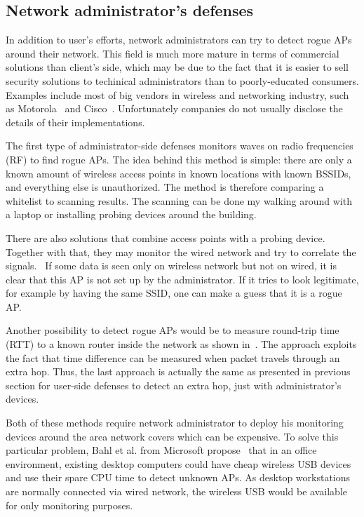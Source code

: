 \documentclass[12pt,a4paper,oneside,pdftex]{report}
\begin{document}
\subsection{Network administrator's defenses}

In addition to user's efforts, network administrators can try to detect rogue APs around their network. This field is much more mature in terms of commercial solutions than client's side, which may be due to the fact that it is easier to sell security solutions to techinical administrators than to poorly-educated consumers. Examples include most of big vendors in wireless and networking industry, such as Motorola~\cite{motorola_airdefense} and Cisco~\cite{cisco_ips}. Unfortunately companies do not usually disclose the details of their implementations.

The first type of administrator-side defenses monitors waves on radio frequencies (RF) to find rogue APs. The idea behind this method is simple: there are only a known amount of wireless access points in known locations with known BSSIDs, and everything else is unauthorized. The method is therefore comparing a whitelist to scanning results. The scanning can be done my walking around with a laptop or installing probing devices around the building.~\cite{proxim_rogue_ap}

There are also solutions that combine access points with a probing device. Together with that, they may monitor the wired network and try to correlate the signals.~\cite{proxim_rogue_ap} If some data is seen only on wireless network but not on wired, it is clear that this AP is not set up by the administrator. If it tries to look legitimate, for example by having the same SSID, one can make a guess that it is a rogue AP.

Another possibility to detect rogue APs would be to measure round-trip time (RTT) to a known router inside the network as shown in~\cite{watkins2007passive}. The approach exploits the fact that time difference can be measured when packet travels through an extra hop. Thus, the last approach is actually the same as presented in previous section for user-side defenses to detect an extra hop, just with administrator's devices.

Both of these methods require network administrator to deploy his monitoring devices around the area network covers which can be expensive. To solve this particular problem, Bahl et al. from Microsoft propose~\cite{bahl2005dair} that in an office environment, existing desktop computers could have cheap wireless USB devices and use their spare CPU time to detect unknown APs. As desktop workstations are normally connected via wired network, the wireless USB would be available for only monitoring purposes.
\end{document}
